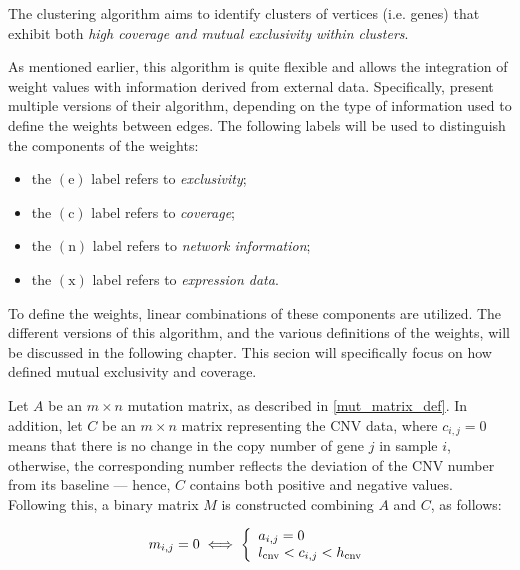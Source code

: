 The clustering algorithm aims to identify clusters of vertices (i.e. genes) that exhibit both \textit{high coverage and mutual exclusivity within clusters}.


As mentioned earlier, this algorithm is quite flexible and allows the integration of weight values with information derived from external data. Specifically, \textcite{c3} present multiple versions of their algorithm, depending on the type of information used to define the weights between edges. The following labels will be used to distinguish the components of the weights:

\begin{itemize}
    \item the $(\mathrm e)$ label refers to \textit{exclusivity};
    \item the $(\mathrm c)$ label refers to \textit{coverage};
    \item the $(\mathrm n)$ label refers to \textit{network information};
    \item the $(\mathrm x)$ label refers to \textit{expression data}.
\end{itemize}

To define the weights, linear combinations of these components are utilized. The different versions of this algorithm, and the various definitions of the weights, will be discussed in the following chapter. This secion will specifically focus on how \textcite{c3} defined mutual exclusivity and coverage.

Let $A$ be an $m \times n$ mutation matrix, as described in \cref{mut_matrix_def}. In addition, let $C$ be an $m \times n$ matrix representing the CNV data, where $c_{i, j} = 0$ means that there is no change in the copy number of gene $j$ in sample $i$, otherwise, the corresponding number reflects the deviation of the CNV number from its baseline --- hence, $C$ contains both positive and negative values. Following this, a binary matrix $M$ is constructed combining $A$ and $C$, as follows:

\begin{equation}
    m_{i, j} = 0 \iff \soe{l}{a_{i, j} = 0 \\ l_{\mathrm{cnv}} < c_{i, j} < h_{\mathrm{cnv}}}
\end{equation}

